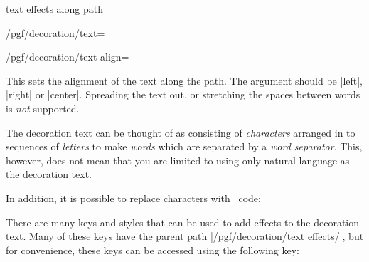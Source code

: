 \begin{decoration}{text effects along path}
\begin{key}{/pgf/decoration/text=}
\end{key}



\begin{key}{/pgf/decoration/text align=}

  This sets the alignment of the text along the path.
  The  argument should be |left|, |right| or |center|.
  Spreading the text out, or stretching the spaces between
  words is \emph{not} supported.
  
\end{key}

	The decoration text can be thought of as consisting
	of \emph{characters} arranged in to sequences of \emph{letters}
	to make \emph{words} which are separated by a \emph{word separator}.
	This, however, does not mean that you are limited to using only
	natural language as the decoration text.

\begin{codeexample}[]
\end{codeexample}
	
	 In addition, it is possible to replace characters
	 with \tikzname\ code:
	 
\begin{codeexample}[]
\end{codeexample}

	 
  There are many keys and styles that can be used to add effects
	 to the decoration text.
	 Many of these keys have the parent path |/pgf/decoration/text effects/|,
	 but for convenience, these keys can be accessed using the following
	 key:
	 

\end{decoration}
